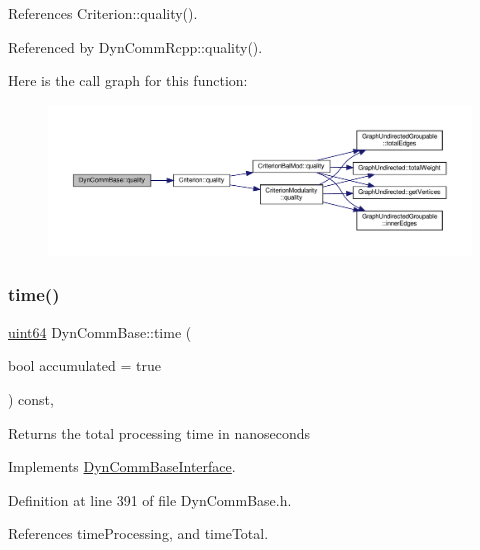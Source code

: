 References Criterion\+::quality().



Referenced by Dyn\+Comm\+Rcpp\+::quality().

Here is the call graph for this function\+:
\nopagebreak
\begin{figure}[H]
\begin{center}
\leavevmode
\includegraphics[width=350pt]{classDynCommBase_a316b2c63a025810211d205ef6bf1d06c_cgraph}
\end{center}
\end{figure}
\mbox{\label{classDynCommBase_a5b40eb14cef877fde1db8b6476f6a2ce}} 
\subsubsection{\texorpdfstring{time()}{time()}}
{\footnotesize\ttfamily \hyperlink{systemDefines_8h_abc0f5bc07737e498f287334775dff2b6}{uint64} Dyn\+Comm\+Base\+::time (\begin{DoxyParamCaption}\item[{bool}]{accumulated = {\ttfamily true} }\end{DoxyParamCaption}) const\hspace{0.3cm}{\ttfamily [inline]}, {\ttfamily [virtual]}}

\begin{DoxyReturn}{Returns}
the total processing time in nanoseconds 
\end{DoxyReturn}


Implements \hyperlink{classDynCommBaseInterface_a6fb483ffc71baf6f0d4f6a0371e34ca9}{Dyn\+Comm\+Base\+Interface}.



Definition at line 391 of file Dyn\+Comm\+Base.\+h.



References time\+Processing, and time\+Total.



